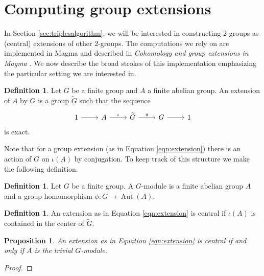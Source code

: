 \documentclass{dcthesis}
\newcommand{\defi}[1]{\textsf{#1}}
\newcommand{\wt}[1]{\widetilde{#1}}
\DeclareMathOperator{\Aut}{Aut}
\numberwithin{equation}{section}
\newtheorem{prop}[equation]{Proposition}
\theoremstyle{definition}
\newtheorem{definition}[equation]{Definition}
\theoremstyle{remark}
\begin{document}
{  \section{Computing group extensions}{\label{sec:modcoho}
    In Section \ref{sec:triplesalgorithm},
    we will be interested in constructing $2$-groups
    as (central) extensions of other $2$-groups.
    The computations we rely on are implemented in
    \textsf{Magma}
    and described in
    \emph{Cohomology and group extensions in \textsf{Magma}}
    \cite{magmabook}.
    We now describe the broad strokes of this implementation
    emphasizing the particular setting we are interested in.
    \begin{definition}
      \label{def:groupextension}
      Let $G$ be a finite group
      and $A$ a finite abelian group.
      An \defi{extension of $A$ by $G$} is
      a group $\wt{G}$ such that the sequence
      \begin{equation}
        \label{eqn:extension}
        \begin{tikzcd}
          1\arrow{r}&A\arrow{r}{\iota}&\wt{G}\arrow{r}{\pi}&G\arrow{r}&1
        \end{tikzcd}
      \end{equation}
      is exact.
    \end{definition}
    Note that for a group extension
    (as in Equation \ref{eqn:extension})
    there is an action of $G$ on
    $\iota(A)$ by conjugation.
    To keep track of this structure we make the
    following definition.
    \begin{definition}
      \label{def:Gmodule}
      Let $G$ be a finite group.
      A \defi{$G$-module}
      is a finite abelian group $A$
      and a group homomorphism
      $\phi\colon G\to\Aut(A)$.
    \end{definition}
    \begin{definition}
      \label{def:centralextension}
      An extension as in Equation \ref{eqn:extension}
      is \defi{central}
      if $\iota(A)$ is contained in the center of $\wt{G}$.
    \end{definition}
    \begin{prop}
      \label{prop:centralextensionstrivialGaction}
      An extension as in Equation \ref{eqn:extension}
      is central
      if and only if $A$ is the trivial $G$-module.
    \end{prop}
    \begin{proof}

\end{proof}}}
\end{document}
